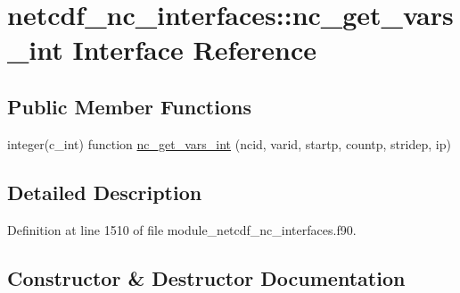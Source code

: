 \hypertarget{interfacenetcdf__nc__interfaces_1_1nc__get__vars__int}{}\section{netcdf\+\_\+nc\+\_\+interfaces\+:\+:nc\+\_\+get\+\_\+vars\+\_\+int Interface Reference}
\label{interfacenetcdf__nc__interfaces_1_1nc__get__vars__int}
\subsection*{Public Member Functions}
\begin{DoxyCompactItemize}
\item 
integer(c\+\_\+int) function \hyperlink{interfacenetcdf__nc__interfaces_1_1nc__get__vars__int_a52eefe7dceba1147b398c8e36b55bd50}{nc\+\_\+get\+\_\+vars\+\_\+int} (ncid, varid, startp, countp, stridep, ip)
\end{DoxyCompactItemize}


\subsection{Detailed Description}


Definition at line 1510 of file module\+\_\+netcdf\+\_\+nc\+\_\+interfaces.\+f90.



\subsection{Constructor \& Destructor Documentation}
\mbox{\label{interfacenetcdf__nc__interfaces_1_1nc__get__vars__int_a52eefe7dceba1147b398c8e36b55bd50}} 
